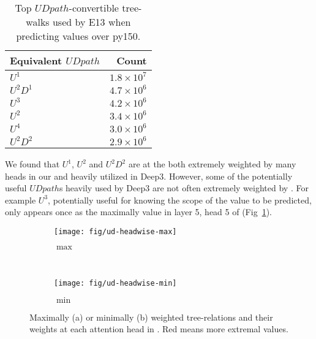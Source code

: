 \documentclass[nonacm, sigconf]{acmart}
\newcommand{\figref}[1]{Fig~\ref{#1}}
\begin{document}
\begin{table}[]
    \centering
    \begin{tabular}{l | r}
    \hline
    Equivalent $\mathit{UDpath}$ & Count \\
    \hline
    $U^1$ & $1.8 \times 10^{7}$ \\
$U^2D^1$ & $4.7 \times 10^{6}$ \\
$U^3$ & $4.2 \times 10^{6}$ \\
$U^2$ & $3.4 \times 10^{6}$ \\
$U^4$ & $3.0 \times 10^{6}$ \\
$U^2D^2$ & $2.9 \times 10^{6}$ \\
    \hline
    \end{tabular}
    \caption{Top $\mathit{UDpath}$-convertible tree-walks used by E13 when predicting values over py150.}
    \label{tab:top-eth-paths}
\end{table}

 
We found that $U^1$, $U^2$ and $U^2 D^2$ are at the both 
extremely weighted by many heads in our \TreeRel 
and heavily utilized in Deep3.
However, some of the potentially useful $\mathit{UDpath}$s heavily used by Deep3 are not often extremely weighted by \TreeRel.
For example $U^3$, potentially useful for knowing the scope of the value to be predicted, only appears once as the maximally value in layer 5, head 5 of \TreeRel (\figref{fig:ud-headwise-max}).

\begin{figure*}
    \centering
    \begin{subfigure}[b]{0.35\textwidth}
        \texttt{[image: fig/ud-headwise-max]}
        \caption{$\max$}
        \label{fig:ud-headwise-max}
    \end{subfigure}
    ~ 
    \begin{subfigure}[b]{0.35\textwidth}
        \texttt{[image: fig/ud-headwise-min]}
        \caption{$\min$}
        \label{fig:ud-headwise-min}
    \end{subfigure}
    \caption{Maximally (a) or minimally (b) weighted tree-relations and their weights at each attention head in \TreeRel.
    \textcolor{ACMRed}{Red} means more extremal values.}
    \label{fig:ud-headwise}
\end{figure*}
\end{document}

